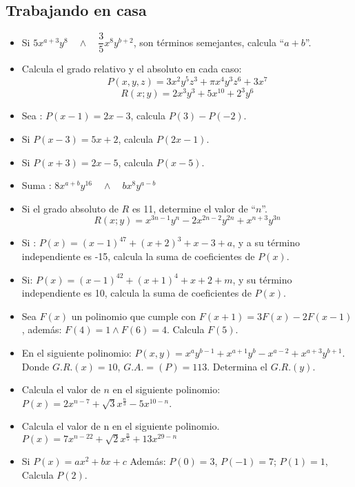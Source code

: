 \documentclass[12pt, a5paper]{article}
\begin{document}
\subsection*{Trabajando en casa}

\begin{itemize}
\item{%
Si $5x^{a + 3}y^{8}\quad\wedge\quad \dfrac{3}{5}x^{8}y^{b + 2}$, son términos semejantes, calcula ``$a + b$''.
}
\item{
Calcula el grado relativo y el absoluto en cada caso:
$$
P(x, y, z) = 3x^{2}y^{5}z^{3} + \pi x^{4}y^{3}z^{6} + 3x^7 
$$
$$
R(x; y) = 2x^{3}y^{3} + 5x^{10} + 2^{3}y^{6}
$$
}
\item{
Sea : $P(x - 1) = 2x - 3$, calcula $P(3) - P(-2)$.
}
\item{
Si $P(x - 3) = 5x + 2$, calcula $P(2x - 1)$.
}
\item{%
Si $P(x + 3) = 2x - 5$, calcula $P(x - 5)$.
}
\item{
Suma : $8x^{a + b}y^{16} \quad\wedge\quad bx^{8}y^{a - b}$
}
\item{
Si el grado absoluto de $R$ es 11, determine el valor de ``$n$''.
$$
R(x; y) = x^{3n - 1}y^{n} - 2x^{2n - 2}y^{2n} + x^{n + 3}y^{3n}
$$
}
\item{
Si : $P(x) = (x - 1)^{47} + (x + 2)^{3} + x - 3 + a$, y a su término independiente es -15, calcula la suma de coeficientes de $P(x)$.
}
\item{%
Si: $P(x) = (x-1)^{42} + (x + 1)^4 + x + 2 + m$, y su término independiente es 10, calcula la suma de coeficientes de $P(x)$.
}
\item{%
Sea $F(x)$ un polinomio que cumple con $F(x+1) = 3F(x) - 2F(x-1)$, además:
$F(4) = 1 \wedge F(6)=4$. Calcula $F(5)$.
}
\item{%
En el siguiente polinomio: $P(x,y) = x^{a}y^{b - 1} + x^{a + 1}y^{b} - x^{a - 2} + x^{a + 3}y^{b + 1}$. Donde $G.R.(x) = 10$, $G.A. = (P) = 113$. Determina el $G.R.(y)$.
}
\item{%
Calcula el valor de $n$ en el siguiente polinomio: $P(x) = 2x^{n-7} + \sqrt{3} x^{\frac{n}{3}} - 5x^{10 - n}$.
}
\item{%
Calcula el valor de n en el siguiente polinomio. $P(x) = 7x^{n-22} + \sqrt{2}x^{\frac{n}{5}} + 13x^{29 -n}$
}
\item{%
Si $P(x) = ax^2 + bx + c$ Además: $P(0) = 3$, $P(-1) = 7$; $P(1) = 1$, Calcula $P(2)$.
}
\end{itemize}
\end{document}
